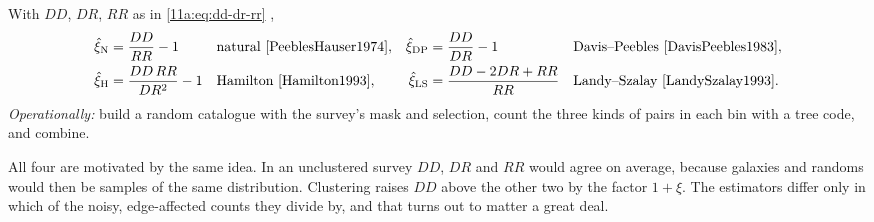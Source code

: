 \begin{workdef}
With $DD$, $DR$, $RR$ as in \eqref{11a:eq:dd-dr-rr} ,
\begin{align*}
  \hat\xi_{\mathrm N}&=\frac{DD}{RR}-1 &&\text{natural \cite{PeeblesHauser1974}},&
  \hat\xi_{\mathrm{DP}}&=\frac{DD}{DR}-1 &&\text{Davis--Peebles \cite{DavisPeebles1983}},\\
  \hat\xi_{\mathrm H}&=\frac{DD\,RR}{DR^2}-1 &&\text{Hamilton \cite{Hamilton1993}},&
  \hat\xi_{\mathrm{LS}}&=\frac{DD-2DR+RR}{RR} &&\text{Landy--Szalay \cite{LandySzalay1993}}.
\end{align*}
\emph{Operationally:} build a random catalogue with the survey's mask and
selection, count the three kinds of pairs in each bin with a tree code, and
combine.
\end{workdef}

All four are motivated by the same idea. In an unclustered survey $DD$, $DR$ and
$RR$ would agree on average, because galaxies and randoms would then be samples
of the same distribution. Clustering raises $DD$ above the other two by the
factor $1+\xi$. The estimators differ only in which of the noisy, edge-affected
counts they divide by, and that turns out to matter a great deal.

